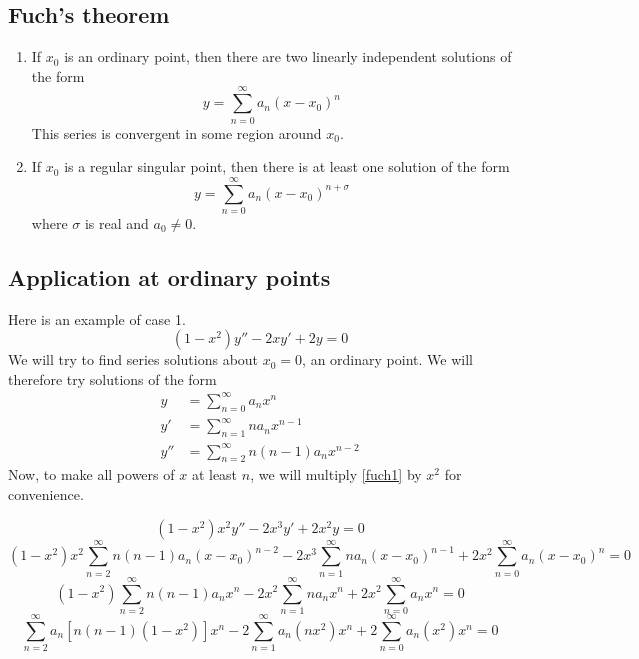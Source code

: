 \subsection{Fuch's theorem}
\begin{theorem}
	\begin{enumerate}
		\item If \(x_0\) is an ordinary point, then there are two linearly independent solutions of the form
		      \[
			      y = \sum_{n=0}^\infty a_n(x-x_0)^n
		      \]
		      This series is convergent in some region around \(x_0\).
		\item If \(x_0\) is a regular singular point, then there is at least one solution of the form
		      \[
			      y = \sum_{n=0}^\infty a_n(x-x_0)^{n + \sigma}
		      \]
		      where \(\sigma\) is real and \(a_0 \neq 0\).
	\end{enumerate}
\end{theorem}

\subsection{Application at ordinary points}
Here is an example of case 1.
\begin{equation}\label{fuch1}
	(1-x^2)y'' - 2xy' + 2y = 0
\end{equation}
We will try to find series solutions about \(x_0=0\), an ordinary point.
We will therefore try solutions of the form
\begin{align*}
	y   & = \sum_{n=0}^\infty a_n x^n           \\
	y'  & = \sum_{n=1}^\infty na_n x^{n-1}      \\
	y'' & = \sum_{n=2}^\infty n(n-1)a_n x^{n-2}
\end{align*}
Now, to make all powers of \(x\) at least \(n\), we will multiply \eqref{fuch1} by \(x^2\) for convenience.

\[
	(1-x^2)x^2y'' - 2x^3y' + 2x^2y = 0
\]
\[
	(1-x^2)x^2\sum_{n=2}^\infty n(n-1)a_n(x-x_0)^{n-2} - 2x^3\sum_{n=1}^\infty na_n(x-x_0)^{n-1} + 2x^2\sum_{n=0}^\infty a_n(x-x_0)^n = 0
\]
\[
	(1-x^2)\sum_{n=2}^\infty n(n-1)a_n x^n - 2x^2\sum_{n=1}^\infty na_n x^n + 2x^2\sum_{n=0}^\infty a_n x^n = 0
\]
\[
	\sum_{n=2}^\infty a_n[n(n-1)(1-x^2)]x^n - 2\sum_{n=1}^\infty a_n(nx^2)x^n + 2\sum_{n=0}^\infty a_n(x^2)x^n = 0
\]

